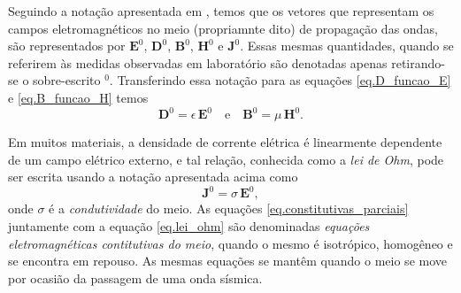 Seguindo a nota\c{c}\~ao apresentada em \cite{erigen_1963}, temos que os vetores que representam os campos eletromagn\'eticos no meio (propriamnte dito) de propaga\c{c}\~ao das ondas, s\~ao representados por $\mathbf{E}^0$, $\mathbf{D}^0$, $\mathbf{B}^0$, $\mathbf{H}^0$ e
$\mathbf{J}^0$. Essas mesmas quantidades, quando se referirem \`as medidas observadas em laborat\'orio s\~ao denotadas apenas retirando-se o sobre-escrito $^0$. Transferindo essa nota\c{c}\~ao para as equa\c{c}\~oes \ref{eq.D_funcao_E} e \ref{eq.B_funcao_H} temos
\begin{equation}\label{eq.constitutivas_parciais}
\mathbf{D}^0=\epsilon\,\mathbf{E}^0\quad\text{e}\quad\mathbf{B}^0=\mu\,\mathbf{H}^0.
\end{equation}

Em muitos materiais, a densidade de corrente el\'etrica \'e linearmente dependente de um campo el\'etrico externo, e tal rela\c{c}\~ao, conhecida como a \textit{lei de Ohm}, pode ser escrita usando a nota\c{c}\~ao apresentada acima como
\begin{equation}\label{eq.lei_ohm}
\mathbf{J}^0=\sigma\,\mathbf{E}^0,
\end{equation}
onde $\sigma$ \'e a \textit{condutividade} do meio. As equa\c{c}\~oes \ref{eq.constitutivas_parciais} juntamente com a equa\c{c}\~ao \ref{eq.lei_ohm} s\~ao denominadas \textit{equa\c{c}\~oes eletromagn\'eticas contitutivas do meio}, quando o mesmo \'e isotr\'opico, homog\^eneo e se encontra em repouso. As mesmas equa\c{c}\~oes se mant\^em quando o meio se move por ocasi\~ao da passagem de uma onda s\'ismica. 

